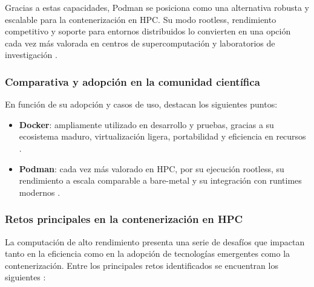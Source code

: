 Gracias a estas capacidades, Podman se posiciona como una alternativa robusta y escalable para la contenerización en HPC. Su modo rootless, rendimiento competitivo y soporte para entornos distribuidos lo convierten en una opción cada vez más valorada en centros de supercomputación y laboratorios de investigación \cite{gantikow2020rootless, stephey2022scaling}.

\subsubsection{Comparativa y adopción en la comunidad científica}

En función de su adopción y casos de uso, destacan los siguientes puntos:

\begin{itemize}
    \item \textbf{Docker}: ampliamente utilizado en desarrollo y pruebas, gracias a su ecosistema maduro, virtualización ligera, portabilidad y eficiencia en recursos \cite{Bhatia2017THERT}.
    \item \textbf{Podman}: cada vez más valorado en HPC, por su ejecución rootless, su rendimiento a escala comparable a bare-metal y su integración con runtimes modernos \cite{gantikow2020rootless, stephey2022scaling}.
\end{itemize}

\subsubsection{Retos principales en la contenerización en HPC}

La computación de alto rendimiento presenta una serie de desafíos que impactan tanto en la eficiencia como en la adopción de tecnologías emergentes como la contenerización. Entre los principales retos identificados se encuentran los siguientes \cite{zhou2022containerisation}:

